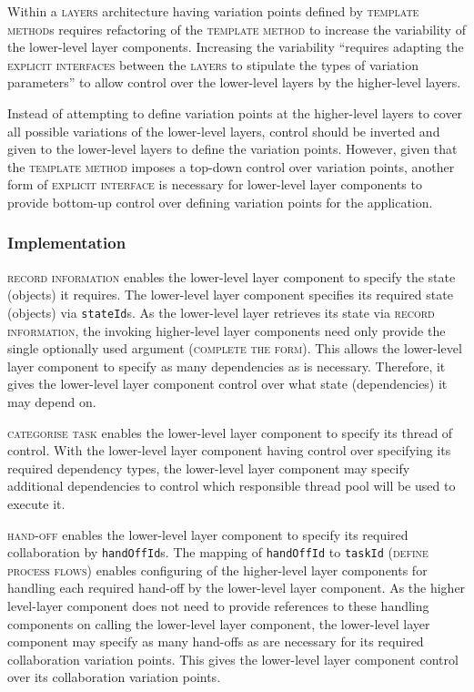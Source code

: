 \documentclass[prodmode]{style/acmlarge}
\begin{document}
Within a \textsc{layers} architecture having variation points defined by
\textsc{template method}s requires refactoring of the \textsc{template method}
to increase the variability of the lower-level layer components.  Increasing the
variability ``requires adapting the \textsc{explicit interfaces} between the
\textsc{layers} to stipulate the types of variation parameters'' \cite[p.
5]{ioc} to allow control over the lower-level layers by the higher-level layers.

Instead of attempting to define variation points at the higher-level layers to
cover all possible variations of the lower-level layers, control should be
inverted and given to the lower-level layers to define the variation points.
However, given that the \textsc{template method} imposes a top-down control over
variation points, another form of \textsc{explicit interface} is necessary for
lower-level layer components to provide bottom-up control over defining
variation points for the application.



\subsubsection*{Implementation}

\textsc{record information} enables the lower-level layer component to specify
the state (objects) it requires.  The lower-level layer component specifies its
required state (objects) via \texttt{stateId}s.  As the lower-level layer
retrieves its state via \textsc{record information}, the invoking higher-level
layer components need only provide the single optionally used argument
(\textsc{complete the form}).  This allows the lower-level layer component to
specify as many dependencies as is necessary.  Therefore, it gives the
lower-level layer component control over what state (dependencies) it
may depend on.

\textsc{categorise task} enables the lower-level layer component to specify its
thread of control.  With the lower-level layer component having control over
specifying its required dependency types, the lower-level layer component may
specify additional dependencies to control which responsible thread pool will be
used to execute it.

\textsc{hand-off} enables the lower-level layer component to specify its
required collaboration by \texttt{handOffId}s.  The mapping of
\texttt{handOffId} to \texttt{taskId} (\textsc{define process flows}) enables
configuring of the higher-level layer components for handling each required
hand-off by the lower-level layer component.  As the higher level-layer
component does not need to provide references to these handling components on
calling the lower-level layer component, the lower-level layer component may
specify as many hand-offs as are necessary for its required collaboration
variation points.  This gives the lower-level layer component control over its
collaboration variation points.
\end{document}
